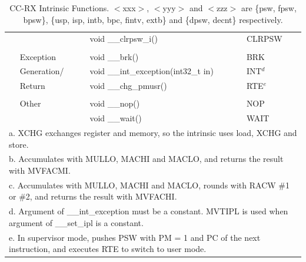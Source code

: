 \begin{table}
\begin{center}
\begin{tabular}{llll}
                  &                   & void \_\_clrpsw\_i()                                                         & CLRPSW                   \\
                  &                   &                                                                              &                          \\
                  & Exception         & void \_\_brk()                                                               & BRK                      \\
                  & Generation/       & void \_\_int\_exception(int32\_t in)                                         & INT$^d$                  \\
                  & Return            & void \_\_chg\_pmusr()                                                        & RTE$^e$                  \\
                  &                   &                                                                              &                          \\
                  & Other             & void \_\_nop()                                                               & NOP                      \\
                  &                   & void \_\_wait()                                                              & WAIT                     \\ \hline
\multicolumn{4}{l}{a. XCHG exchanges register and memory, so the intrinsic uses load, XCHG and store.} \\
\multicolumn{4}{l}{b. Accumulates with MULLO, MACHI and MACLO, and returns the result with MVFACMI.} \\
\multicolumn{4}{l}{c. Accumulates with MULLO, MACHI and MACLO, rounds with RACW \#1 or \#2, and returns the result with MVFACHI.} \\
\multicolumn{4}{l}{d. Argument of \_\_int\_exception must be a constant. MVTIPL is used when argument of \_\_set\_ipl is a constant.} \\
\multicolumn{4}{l}{e. In supervisor mode, pushes PSW with PM = 1 and PC of the next instruction, and executes RTE to switch to user mode.} \\
\end{tabular}
\end{center}
\captionsetup{font=scriptsize, labelfont=scriptsize}
\caption{CC-RX Intrinsic Functions. $<$xxx$>$, $<$yyy$>$ and $<$zzz$>$ are \{psw, fpsw, bpsw\}, 
\{usp, isp, intb, bpc, fintv, extb\} and \{dpsw, decnt\} respectively.}
\end{table}

